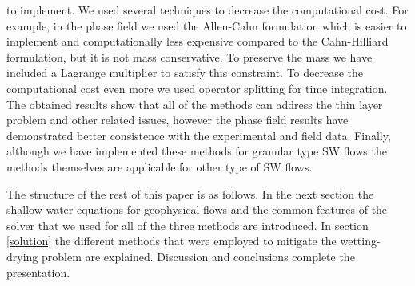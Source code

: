 \documentclass[review]{elsarticle}
\begin{document}
to implement. We used several techniques to decrease the computational cost. For example, in the phase field we used the Allen-Cahn formulation which is easier to implement and computationally less 
expensive compared to the Cahn-Hilliard formulation, but it is not mass conservative. To preserve the mass we have included a Lagrange multiplier \cite{Kim2014,Yang2006} to satisfy this constraint. 
To decrease the computational cost even more we used operator splitting for time integration. The obtained results show that all of the methods can address the thin layer problem and other 
related issues, however the phase field results have demonstrated better consistence with the experimental and field data. 
Finally, although we have implemented these methods for granular type SW flows the methods themselves are applicable for other type of SW flows.  

The structure of the rest of this paper is as follows. In the next section the shallow-water equations for geophysical flows and 
the common features of the solver that we used for all of the three methods are 
introduced. In section \ref{solution} the different methods that were employed to mitigate the wetting-drying problem are explained. 
Discussion and conclusions complete the presentation.
\end{document}
